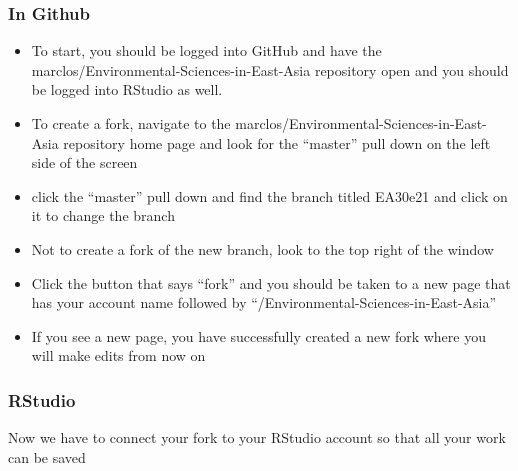 \documentclass[12pt]{../SOP4_alpha}\usepackage[]{graphicx}\usepackage[]{color}
\begin{document}
\subsubsection{In Github}
\begin{itemize}
\item To start, you should be logged into GitHub and have the marclos/Environmental-Sciences-in-East-Asia repository open and you should be logged into RStudio as well.

\item To create a fork, navigate to the marclos/Environmental-Sciences-in-East-Asia repository home page and look for the ``master'' pull down on the left side of the screen

\item click the ``master'' pull down and find the branch titled EA30e21 and click on it to change the branch

\item Not to create a fork of the new branch, look to the top right of the window

  \item Click the button that says ``fork'' and you should be taken to a new page that has your account name followed by ``/Environmental-Sciences-in-East-Asia''
  \item If you see a new page, you have successfully created a new fork where you will make edits from now on 
\end{itemize}


\subsubsection{RStudio}
Now we have to connect your fork to your RStudio account so that all your work can be saved 
\end{document}

